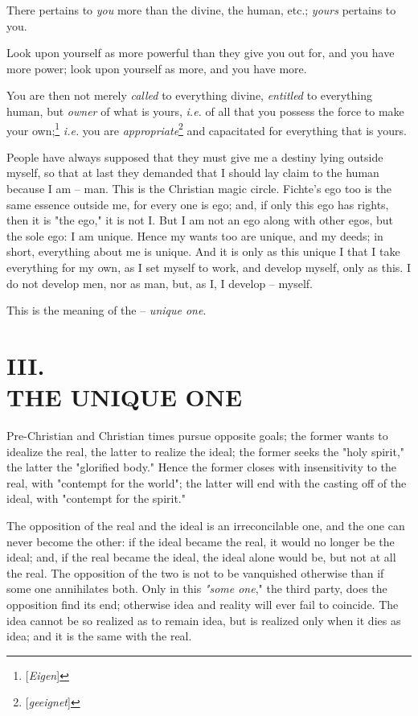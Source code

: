 \documentclass[a4paper]{book}
\begin{document}
There pertains to \textit{you} more than the divine, the human, etc.; 
\textit{yours} pertains to you.

Look upon yourself as more powerful than they give you out for, and you have 
more power; look upon yourself as more, and you have more.

You are then not merely \textit{called} to everything divine, 
\textit{entitled} to everything human, but \textit{owner} of what is yours, 
\textit{i.e.} of all that you possess the force to make your 
own;\footnote{[\textit{Eigen}]} \textit{i.e.} you are 
\textit{appropriate}\footnote{[\textit{geeignet}]} and capacitated for 
everything that is yours.

People have always supposed that they must give me a destiny lying outside 
myself, so that at last they demanded that I should lay claim to the human 
because I am -- man. This is the Christian magic circle. Fichte's ego too is 
the same essence outside me, for every one is ego; and, if only this ego has 
rights, then it is "{}the ego,"{} it is not I. But I am not an ego along with 
other egos, but the sole ego: I am unique. Hence my wants too are unique, and 
my deeds; in short, everything about me is unique. And it is only as this 
unique I that I take everything for my own, as I set myself to work, and 
develop myself, only as this. I do not develop men, nor as man, but, as I, I 
develop -- myself.

This is the meaning of the -- \textit{unique one}.

\chapter[III. The Unique One]{\centering III.\\
THE UNIQUE ONE}

Pre-Christian and Christian times pursue opposite goals; the former wants to 
idealize the real, the latter to realize the ideal; the former seeks the 
"{}holy spirit,"{} the latter the "{}glorified body."{} Hence the former 
closes with insensitivity to the real, with "{}contempt for the world"{}; the 
latter will end with the casting off of the ideal, with "{}contempt for the 
spirit."{}

The opposition of the real and the ideal is an irreconcilable one, and the one 
can never become the other: if the ideal became the real, it would no longer 
be the ideal; and, if the real became the ideal, the ideal alone would be, but 
not at all the real. The opposition of the two is not to be vanquished 
otherwise than if some one annihilates both. Only in this \textit{"{}some 
one},"{} the third party, does the opposition find its end; otherwise idea and 
reality will ever fail to coincide. The idea cannot be so realized as to 
remain idea, but is realized only when it dies as idea; and it is the same 
with the real.
\end{document}

